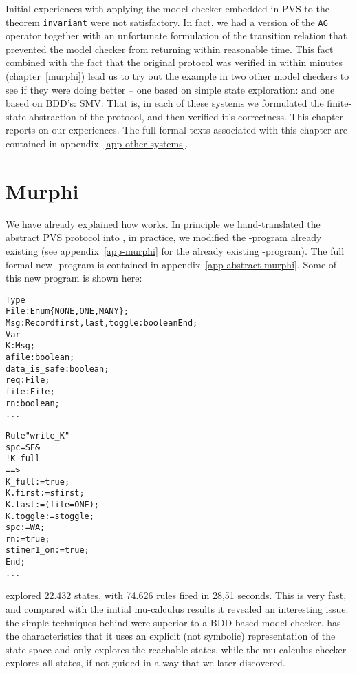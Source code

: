 

Initial experiences with applying the model checker embedded in PVS to
the theorem  {\tt invariant} were  not satisfactory.  In fact, we
had a version  of the {\tt  AG} operator together with  an unfortunate
formulation  of  the transition   relation   that prevented the  model
checker  from returning within  reasonable  time.  This fact  combined
with the fact   that the original  protocol was  verified in \Murphi{}
within minutes  (chapter~\ref{murphi}) lead  us to try out the example
in  two other model checkers  to see if they  were doing better -- one
based  on simple state exploration: \Murphi{}  and one based on BDD's:
SMV.  That is, in each of these systems we formulated the finite-state
abstraction of the protocol, and then verified it's correctness.  This
chapter reports on our experiences.  The  full formal texts associated
with this chapter are contained in appendix~\ref{app-other-systems}.

\section{Murphi}\label{modelcheck-abstract-murphi}

We have   already  explained how   \Murphi{} works.  In   principle we
hand-translated the abstract PVS  protocol into \Murphi,  in practice,
we      modified    the  \Murphi{}-program    already    existing (see
appendix~\ref{app-murphi}  for the  already existing \Murphi-program).
The    full formal   new       \Murphi{}-program is   contained     in
appendix~\ref{app-abstract-murphi}. Some of this  new program is shown
here:

\begin{alltt}
  Type
    File : Enum\{NONE,ONE,MANY\}; 
    Msg  : Record first, last, toggle : boolean End;
  Var
    K : Msg;
    afile  : boolean;
    data_is_safe : boolean;
    req : File;
    file : File;
    rn : boolean;
  ...

  Rule "write_K"
    spc = SF &
    !K_full
      ==>
    K_full := true;
    K.first := sfirst;
    K.last := (file=ONE);
    K.toggle:= stoggle;
    spc:= WA;
    rn := true;
    stimer1_on := true;
  End;
  ...
\end{alltt}

\Murphi{} explored 22.432  states, with 74.626 rules fired in
28,51 seconds.   This is  very   fast, and compared  with the  initial
mu-calculus  results it  revealed  an  interesting issue:  the  simple
techniques  behind  \Murphi{} were  superior   to  a BDD-based  model
checker.  \Murphi{}  has the  characteristics that it  uses an explicit
(not symbolic) representation of the state space and only explores the
reachable  states, while the mu-calculus  checker explores all states,
if not guided in a way that we later discovered.


